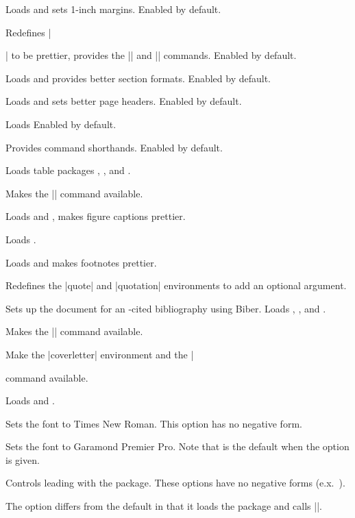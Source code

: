 \documentclass{ltxguidex}
\begin{document}
\begin{keys}
	Loads  and sets 1-inch margins. Enabled by default.

	Redefines |\maketitle| to be prettier, provides the |\heading| and
	|\essayintro| commands. Enabled by default.

	Loads  and provides better section formats. Enabled by
	default.

	Loads  and sets better page headers. Enabled by default.

	Loads  Enabled by default.

	Provides command shorthands. Enabled by default.

	Loads table packages , , and
	.

	Makes the |\Th| command available.

	Loads  and , makes figure captions
	prettier.

	Loads .

	Loads  and makes footnotes prettier.

	Redefines the |quote| and |quotation| environments to add an
	optional argument.

	Sets up the document for an \mla-cited bibliography using Biber.
	Loads , , and .

	Makes the |\fullcite| command available.

	Make the |coverletter| environment and the |\address| command
	available.

	Loads  and .

	Sets the font to Times New Roman. This option has no negative form.

	Sets the font to Garamond Premier Pro. Note that 
	is the default when the  option is given.

	Controls leading with the  package. These options
	have no negative forms (e.x.\ ).

	\begin{note}
		The  option differs from the default in that it
		loads the  package and calls
		|\singlespace|.
	\end{note}
\end{keys}
\end{document}
